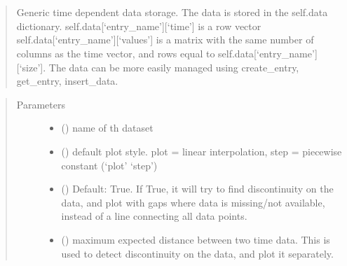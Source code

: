 \documentclass[letterpaper,10pt,english]{sphinxmanual}
\begin{document}
\begin{fulllineitems}
\label{\detokenize{yaocptool.modelling:yaocptool.modelling.dataset.DataSet}}~

\begin{fulllineitems}
\label{\detokenize{yaocptool.modelling:yaocptool.modelling.dataset.DataSet.__init__}}~\begin{quote}

Generic time dependent data storage.
The data is stored in the self.data dictionary.
self.data{[}‘entry\_name’{]}{[}‘time’{]} is a row vector
self.data{[}‘entry\_name’{]}{[}‘values’{]} is a matrix with the same number of columns as the time vector, and
rows equal to self.data{[}‘entry\_name’{]}{[}‘size’{]}.
The data can be more easily managed using create\_entry, get\_entry, insert\_data.
\end{quote}
\begin{quote}\begin{description}
\item[{Parameters}] \leavevmode\begin{itemize}
\item {} 
 () \textendash{} name of th dataset

\item {} 
 () \textendash{} default plot style. plot = linear interpolation, step = piecewise constant (‘plot’ \textbar{} ‘step’)

\item {} 
 () \textendash{} Default: True. If True, it will try to find discontinuity on the data, and plot
with gaps where data is missing/not available, instead of a line connecting all data points.

\item {} 
 () \textendash{} maximum expected distance between two time data. This is used to detect
discontinuity on the data, and plot it separately.


\end{itemize}
\end{description}
\end{quote}
\end{fulllineitems}
\end{fulllineitems}
\end{document}

